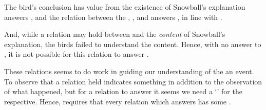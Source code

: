 \begin{note}
\begin{itemize}[noitemsep]
    The bird's conclusion  has value  from the existence of Snowball's explanation answers \qHow{}, and the relation between the , , and \pool{} answers \qWhy{}, in line with \issueInclusion{}.

    And, while a relation may hold between   and the \emph{content} of Snowball's explanation, the birds failed to understand the content.
    Hence, with no answer to \qHow{}, it is not possible for this relation to answer \qWhy{}.
  \end{itemize}
  These relations seems to do work in guiding our understanding of the an event.
  To observe that a relation held indicates something in addition to the observation of what happened, but for a relation to answer \qWhy{} it seems we need a `\wit{}' for the respective.
  Hence, \issueInclusion{} requires that every relation which answers \qWhy{} has some \wit{}.
\end{note}

